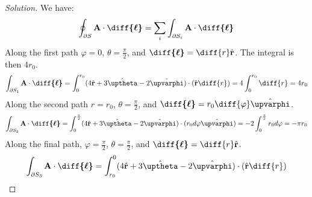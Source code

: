             \begin{proof}[Solution]
                We have:
                \begin{equation*}
                    \oint_{\partial S}
                    \mathbf{A}\cdot\boldsymbol{\diff{\ell}}
                    =\sum_{i}\int_{\partial{S_{i}}}
                    \mathbf{A}\cdot\boldsymbol{\diff{\ell}}
                \end{equation*}
                Along the first path $\varphi=0$,
                $\theta=\frac{\pi}{2}$, and
                $\boldsymbol{\diff{\ell}}%
                 =\diff{r}\hat{\mathbf{r}}$.
                The integral is then $4r_{0}$.
                \begin{equation*}
                    \int_{\partial S_{1}}
                    \mathbf{A}\cdot\boldsymbol{\diff{\ell}}
                    =\int_{0}^{r_{0}}
                    (4\hat{\mathbf{r}}
                    +3\hat{\boldsymbol{\uptheta}}
                    -2\hat{\boldsymbol{\upvarphi}})
                    \cdot(\hat{\mathbf{r}}\diff{r})
                    =4\int_{0}^{r_{0}}\diff{r}
                    =4r_{0}
                \end{equation*}
                Along the second path $r=r_{0}$,
                $\theta=\frac{\pi}{2}$, and 
                $\boldsymbol{\diff{\ell}}%
                 =r_{0}\diff{\varphi}\hat{\boldsymbol{\upvarphi}}$.
                \begin{equation*}
                    \int_{\partial S_{2}}
                    \mathbf{A}\cdot\boldsymbol{\diff{\ell}}
                    =\int_{0}^{\frac{\pi}{2}}(4\hat{\mathbf{r}}
                    +3\hat{\boldsymbol{\uptheta}}
                    -2\hat{\boldsymbol{\upvarphi}})
                    \cdot(r_{0}d\varphi\hat{\boldsymbol{\upvarphi}})
                    =-2\int_{0}^{\frac{\pi}{2}}r_{0}d\varphi
                    =-\pi r_{0}
                \end{equation*}
                Along the final path, $\varphi=\frac{\pi}{2}$,
                $\theta=\frac{\pi}{2}$, and
                $\boldsymbol{\diff{\ell}}%
                 =\diff{r}\hat{\mathbf{r}}$.
                \begin{equation*}
                    \int_{\partial S_{3}}
                    \mathbf{A}\cdot\boldsymbol{\diff{\ell}}
                    =\int_{r_{0}}^{0}
                    (4\hat{\mathbf{r}}
                     +3\hat{\boldsymbol{\uptheta}}
                     -2\hat{\boldsymbol{\upvarphi}})
                    \cdot(\hat{\mathbf{r}}\diff{r})

\end{equation*}
\end{proof}
